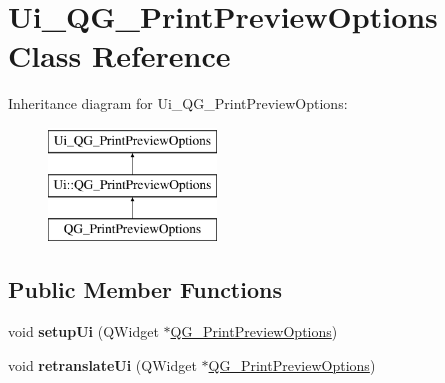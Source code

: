 \hypertarget{classUi__QG__PrintPreviewOptions}{\section{Ui\-\_\-\-Q\-G\-\_\-\-Print\-Preview\-Options Class Reference}
\label{classUi__QG__PrintPreviewOptions}
}
Inheritance diagram for Ui\-\_\-\-Q\-G\-\_\-\-Print\-Preview\-Options\-:\begin{figure}[H]
\begin{center}
\leavevmode
\includegraphics[height=3.000000cm]{classUi__QG__PrintPreviewOptions}
\end{center}
\end{figure}
\subsection*{Public Member Functions}
\begin{DoxyCompactItemize}
\item 
\hypertarget{classUi__QG__PrintPreviewOptions_a17971ac8b68fa2e999d016b48824ec20}{void {\bfseries setup\-Ui} (Q\-Widget $\ast$\hyperlink{classQG__PrintPreviewOptions}{Q\-G\-\_\-\-Print\-Preview\-Options})}\label{classUi__QG__PrintPreviewOptions_a17971ac8b68fa2e999d016b48824ec20}

\item 
\hypertarget{classUi__QG__PrintPreviewOptions_a0474a03bfd2e1a4f470d3b64bf5007f8}{void {\bfseries retranslate\-Ui} (Q\-Widget $\ast$\hyperlink{classQG__PrintPreviewOptions}{Q\-G\-\_\-\-Print\-Preview\-Options})}\label{classUi__QG__PrintPreviewOptions_a0474a03bfd2e1a4f470d3b64bf5007f8}

\end{DoxyCompactItemize}

